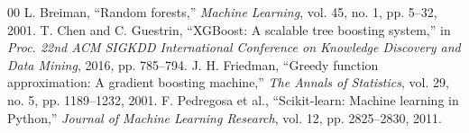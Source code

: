 \documentclass[conference]{IEEEtran}
\begin{document}
\begin{thebibliography}{00}
 L. Breiman, ``Random forests,'' \textit{Machine Learning}, vol. 45, no. 1, pp. 5--32, 2001.
 T. Chen and C. Guestrin, ``XGBoost: A scalable tree boosting system,'' in \textit{Proc. 22nd ACM SIGKDD International Conference on Knowledge Discovery and Data Mining}, 2016, pp. 785--794.
 J. H. Friedman, ``Greedy function approximation: A gradient boosting machine,'' \textit{The Annals of Statistics}, vol. 29, no. 5, pp. 1189--1232, 2001.
 F. Pedregosa et al., ``Scikit-learn: Machine learning in Python,'' \textit{Journal of Machine Learning Research}, vol. 12, pp. 2825--2830, 2011.
\end{thebibliography}
\end{document}
